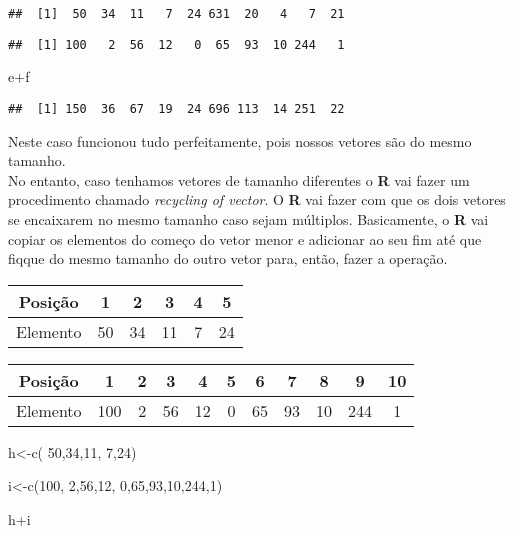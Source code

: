 \documentclass[
]{book}
\newenvironment{Shaded}{\begin{snugshade}}{\end{snugshade}}
\newcommand{\DecValTok}[1]{\textcolor[rgb]{0.00,0.00,0.81}{#1}}
\newcommand{\FunctionTok}[1]{\textcolor[rgb]{0.00,0.00,0.00}{#1}}
\newcommand{\NormalTok}[1]{#1}
\newcommand{\OtherTok}[1]{\textcolor[rgb]{0.56,0.35,0.01}{#1}}
\newcommand{\SpecialCharTok}[1]{\textcolor[rgb]{0.00,0.00,0.00}{#1}}
\begin{document}
\begin{verbatim}
##  [1]  50  34  11   7  24 631  20   4   7  21
\end{verbatim}

\begin{verbatim}
##  [1] 100   2  56  12   0  65  93  10 244   1
\end{verbatim}

\begin{Shaded}
\begin{Highlighting}[]
\NormalTok{e}\SpecialCharTok{+}\NormalTok{f}
\end{Highlighting}
\end{Shaded}

\begin{verbatim}
##  [1] 150  36  67  19  24 696 113  14 251  22
\end{verbatim}

Neste caso funcionou tudo perfeitamente, pois nossos vetores são do mesmo tamanho.\\
No entanto, caso tenhamos vetores de tamanho diferentes o \textbf{R} vai fazer um procedimento chamado \emph{\emph{recycling of vector}}. O \textbf{R} vai fazer com que os dois vetores se encaixarem no mesmo tamanho caso sejam múltiplos. Basicamente, o \textbf{R} vai copiar os elementos do começo do vetor menor e adicionar ao seu fim até que fiqque do mesmo tamanho do outro vetor para, então, fazer a operação.

\begin{longtable}[]{@{}cccccc@{}}
\toprule
Posição & 1 & 2 & 3 & 4 & 5 \\
\midrule
\endhead
Elemento & 50 & 34 & 11 & 7 & 24 \\
\bottomrule
\end{longtable}

\begin{longtable}[]{@{}ccccccccccc@{}}
\toprule
Posição & 1 & 2 & 3 & 4 & 5 & 6 & 7 & 8 & 9 & 10 \\
\midrule
\endhead
Elemento & 100 & 2 & 56 & 12 & 0 & 65 & 93 & 10 & 244 & 1 \\
\bottomrule
\end{longtable}

\begin{Shaded}
\begin{Highlighting}[]
\NormalTok{h}\OtherTok{\textless{}{-}}\FunctionTok{c}\NormalTok{( }\DecValTok{50}\NormalTok{,}\DecValTok{34}\NormalTok{,}\DecValTok{11}\NormalTok{, }\DecValTok{7}\NormalTok{,}\DecValTok{24}\NormalTok{)}

\NormalTok{i}\OtherTok{\textless{}{-}}\FunctionTok{c}\NormalTok{(}\DecValTok{100}\NormalTok{, }\DecValTok{2}\NormalTok{,}\DecValTok{56}\NormalTok{,}\DecValTok{12}\NormalTok{, }\DecValTok{0}\NormalTok{,}\DecValTok{65}\NormalTok{,}\DecValTok{93}\NormalTok{,}\DecValTok{10}\NormalTok{,}\DecValTok{244}\NormalTok{,}\DecValTok{1}\NormalTok{)}

\NormalTok{h}\SpecialCharTok{+}\NormalTok{i}
\end{Highlighting}
\end{Shaded}
\end{document}
